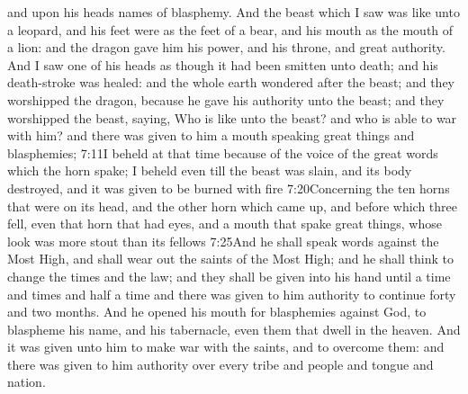  and upon his heads names of blasphemy. 
 And the beast which I saw was like unto a leopard, and his feet were as the feet of a bear, and his mouth as the mouth of a lion: and the dragon gave him his power, and his throne, and great authority. 
 And I saw one of his heads as though it had been smitten unto death; and his death-stroke was healed: and the whole earth wondered after the beast; 
 and they worshipped the dragon, because he gave his authority unto the beast; and they worshipped the beast, saying, Who is like unto the beast?
 and who is able to war with him? 
 and there was given to him a mouth speaking great things and blasphemies;%
				       {7:11}{I beheld at that time because of the voice of the great words which the horn spake; I beheld even till the beast was slain, and its body destroyed, and it was given to be burned with fire}%
					   {7:20}{Concerning the ten horns that were on its head, and the other horn which came up, and before which three fell, even that horn that had eyes, and a mouth that spake great things, whose look was more stout than its fellows}
					   {7:25}{And he shall speak words against the Most High, and shall wear out the saints of the Most High; and he shall think to change the times and the law; and they shall be given into his hand until a time and times and half a time}
 and there was given to him authority to continue forty and two months. 
 And he opened his mouth for blasphemies against God, to blaspheme his name, and his tabernacle, even them that dwell in the heaven.%
 And it was given unto him to make war with the saints, and to overcome them: and there was given to him authority over every tribe and people and tongue and nation. 
